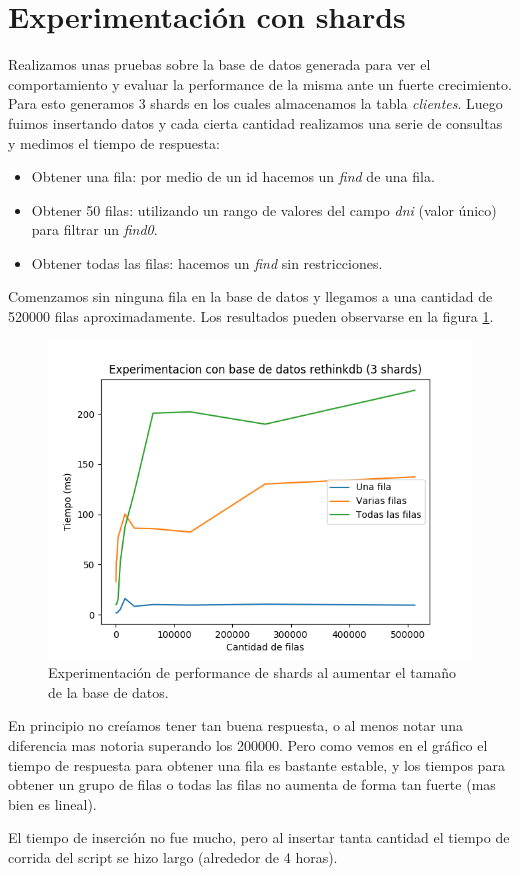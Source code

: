 \section{Experimentación con shards}

\par Realizamos unas pruebas sobre la base de datos generada para ver el comportamiento y evaluar la performance de la misma ante un fuerte crecimiento.
Para esto generamos 3 shards en los cuales almacenamos la tabla \textit{clientes}. Luego fuimos insertando datos y cada cierta cantidad realizamos una serie de consultas y medimos el tiempo de respuesta:
\begin{itemize}
  \item Obtener una fila: por medio de un id hacemos un \textit{find} de una fila.
  \item Obtener 50 filas: utilizando un rango de valores del campo \textit{dni} (valor único) para filtrar un \textit{find0}.
  \item Obtener todas las filas: hacemos un \textit{find} sin restricciones.
\end{itemize}

\par Comenzamos sin ninguna fila en la base de datos y llegamos a una cantidad de 520000 filas aproximadamente.
Los resultados pueden observarse en la figura \ref{fig:testing}.

\begin{figure}
  \includegraphics[width=\textwidth]{src/shards-testing.png}
  \caption{Experimentación de performance de shards al aumentar el tamaño de la base de datos.}
  \label{fig:testing}
\end{figure}

\par En principio no creíamos tener tan buena respuesta, o al menos notar una diferencia mas notoria superando los 200000.
Pero como vemos en el gráfico el tiempo de respuesta para obtener una fila es bastante estable, y los tiempos para obtener un grupo de filas o todas las filas no aumenta de forma tan fuerte (mas bien es lineal).

\par El tiempo de inserción no fue mucho, pero al insertar tanta cantidad el tiempo de corrida del script se hizo largo (alrededor de 4 horas).
